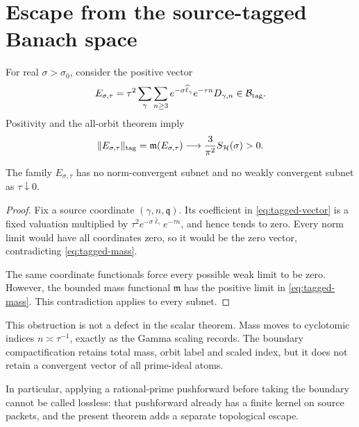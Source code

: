 \section{Escape from the source-tagged Banach space}

For real $\sigma>\sigma_0$, consider the positive vector
\begin{equation}
 E_{\sigma,\tau}
 =\tau^2\sum_\gamma\sum_{n\ge3}
 e^{-\sigma\widehat\ell_\gamma}e^{-\tau n}D_{\gamma,n}
 \in\mathcal B_{\mathrm{tag}}.
 \label{eq:tagged-vector}
\end{equation}
Positivity and the all-orbit theorem imply
\begin{equation}
 \|E_{\sigma,\tau}\|_{\rm tag}
 =\mathfrak m(E_{\sigma,\tau})
 \longrightarrow\frac3{\pi^2}S_{\mathcal H}(\sigma)>0.
 \label{eq:tagged-mass}
\end{equation}

\begin{theorem}
The family $E_{\sigma,\tau}$ has no norm-convergent subnet and no weakly
convergent subnet as $\tau\downarrow0$.
\end{theorem}

\begin{proof}
Fix a source coordinate $(\gamma,n,\mathfrak q)$.  Its coefficient in
\eqref{eq:tagged-vector} is a fixed valuation multiplied by
$\tau^2e^{-\sigma\widehat\ell_\gamma}e^{-\tau n}$, and hence tends to zero.
Every norm limit would have all coordinates zero, so it would be the zero
vector, contradicting \eqref{eq:tagged-mass}.

The same coordinate functionals force every possible weak limit to be zero.
However, the bounded mass functional $\mathfrak m$ has the positive limit in
\eqref{eq:tagged-mass}.  This contradiction applies to every subnet.
\end{proof}

This obstruction is not a defect in the scalar theorem.  Mass moves to
cyclotomic indices $n\asymp\tau^{-1}$, exactly as the Gamma scaling records.
The boundary compactification retains total mass, orbit label and scaled
index, but it does not retain a convergent vector of all prime-ideal atoms.

In particular, applying a rational-prime pushforward before taking the
boundary cannot be called lossless: that pushforward already has a finite
kernel on source packets, and the present theorem adds a separate topological
escape.
